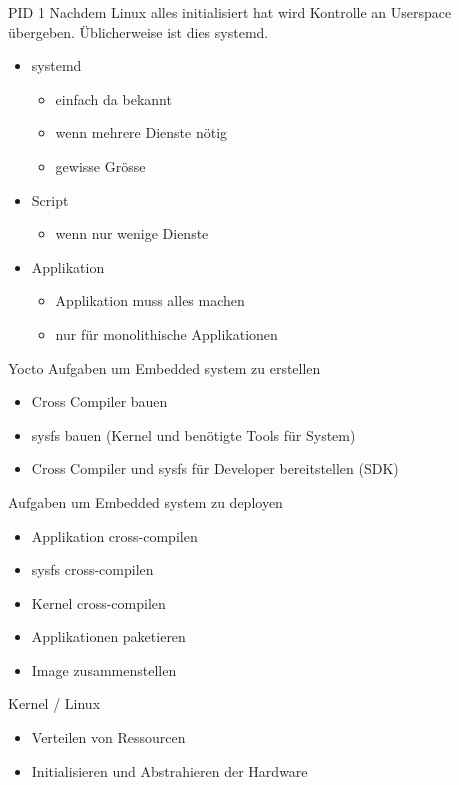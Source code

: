 \begin{frame}{PID 1}
	Nachdem Linux alles initialisiert hat wird Kontrolle an Userspace übergeben.
	Üblicherweise ist dies systemd.
	\begin{itemize}
		\item systemd
		\begin{itemize}
			\item einfach da bekannt
			\item wenn mehrere Dienste nötig
			\item gewisse Grösse
		\end{itemize}
		\item Script
		\begin{itemize}
			\item wenn nur wenige Dienste
		\end{itemize}
		\item Applikation
		\begin{itemize}
			\item Applikation muss alles machen
			\item nur für monolithische Applikationen
		\end{itemize}
	\end{itemize}
\end{frame}

\begin{frame}{Yocto}
	Aufgaben um Embedded system zu erstellen
	\begin{itemize}
		\item Cross Compiler bauen
		\item sysfs bauen (Kernel und benötigte Tools für System)
		\item Cross Compiler und sysfs für Developer bereitstellen (SDK)
	\end{itemize}
	Aufgaben um Embedded system zu deployen
	\begin{itemize}
		\item Applikation cross-compilen
		\item sysfs cross-compilen
		\item Kernel cross-compilen
		\item Applikationen paketieren
		\item Image zusammenstellen
	\end{itemize}
\end{frame}

\begin{frame}{Kernel / Linux}
	\begin{itemize}
		\item Verteilen von Ressourcen
		\item Initialisieren und Abstrahieren der Hardware
	\end{itemize}
\end{frame}

